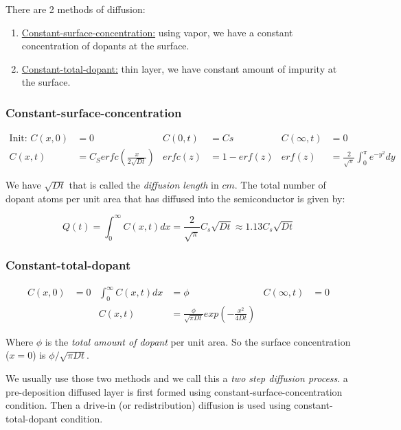 \documentclass{report}
\begin{document}
There are 2 methods of diffusion:

\begin{enumerate}
    \item \underline{Constant-surface-concentration:} using vapor, we have a constant concentration of dopants at the surface.
    \item \underline{Constant-total-dopant:} thin layer, we have constant amount of impurity at the surface.
\end{enumerate}

\subsubsection{Constant-surface-concentration}

\begin{align}
    \text{Init: } C(x,0) &= 0 & C(0,t) &= Cs & C(\infty, t) &=0\\
    C(x,t) &= C_S erfc\left( \frac{x}{2\sqrt{Dt}} \right) & erfc(z) &= 1-erf(z) & erf(z)&=\frac{2}{\sqrt{\pi}}\int_0^\pi e^{-y^2} dy
\end{align}

We have $\sqrt{Dt}$ that is called the \textit{diffusion length} in $cm$. The total number of dopant atoms per unit area that has diffused into the semiconductor is given by:

\begin{equation}
    Q(t) = \int_{0}^\infty C(x,t) dx = \frac{2}{\sqrt{\pi}} C_s \sqrt{Dt} \approx 1.13 C_s \sqrt{Dt}
\end{equation}

\subsubsection{Constant-total-dopant}

\begin{align}
    C(x,0) &= 0 & \int_0^\infty C(x,t) dx &= \phi & C(\infty, t) &= 0\\
     & & C(x,t) &= \frac{\phi}{\sqrt{\pi D t}} exp \left( - \frac{x^2}{4 D t} \right)
\end{align}

Where $\phi$ is the \textit{total amount of dopant} per unit area. So the surface concentration ($x=0$) is $\phi / \sqrt{\pi Dt}$.

We usually use those two methods and we call this a \textit{two step diffusion process}. a pre-deposition diffused layer is first formed using constant-surface-concentration condition. Then a drive-in (or redistribution) diffusion is used using constant-total-dopant condition.
\end{document}
